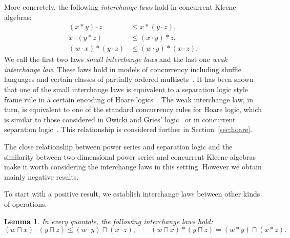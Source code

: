 \documentclass[12pt]{article}
\newtheorem{lemma}{Lemma}
\theoremstyle{definition}
\begin{document}
More concretely, the following \emph{interchange laws} hold in
concurrent Kleene algebras:
\begin{align*}
  (x\ast y)\cdot z & \le x\ast (y\cdot z),\\
  x\cdot (y\ast z) & \le (x\cdot y)\ast z ,\\
  (w\cdot x)\ast (y\cdot z) & \le (w\cdot y)\ast (x\cdot z).
\end{align*}
We call the first two laws \emph{small interchange laws} and the last
one \emph{weak interchange law}.  These laws hold in models of
concurrency including shuffle languages and certain classes of
partially ordered multisets~\cite{Gischer}. It has been shown that one
of the small interchange laws is equivalent to a separation logic style
frame rule in a certain encoding of Hoare logics~\cite{Locality}. The
weak interchange law, in turn, is equivalent to one of the standard
concurrency rules for Hoare logic, which is similar to those
considered in Owicki and Gries' logic~\cite{OG76} or in concurrent
separation logic~\cite{COY07}. This relationship is considered further
in Section~\ref{sec:hoare}.

The close relationship between power series and separation logic and
the similarity between two-dimensional power series and concurrent
Kleene algebras make it worth considering the interchange laws in this
setting.  However we obtain mainly negative results.

To start with a positive result, we establish interchange laws between
other kinds of operations.





\begin{lemma}\label{P:quantaleprops}
  In every quantale, the following interchange laws hold:
\begin{equation*}
  (w\sqcap x)\cdot (y\sqcap z) \le (w\cdot
  y)\sqcap (x\cdot z),\qquad (w\sqcap x)\ast (y\sqcap z) = (w\ast
  y)\sqcap (x\ast z).
  \end{equation*}
\end{lemma}
\end{document}
